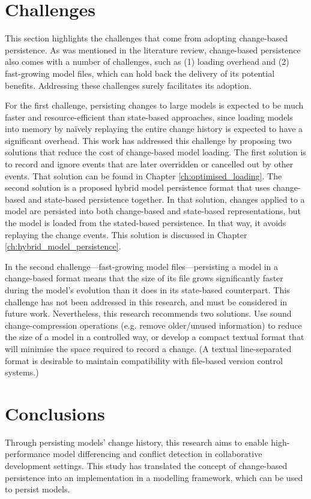 \section{Challenges}
\label{sec:challenges}
This section highlights the challenges that come from adopting change-based persistence. As was mentioned in the literature review, change-based persistence also comes with a number of challenges, such as (1) loading overhead and (2) fast-growing model files, which can hold back the delivery of its potential benefits. Addressing these challenges surely facilitates its adoption.

For the first challenge, persisting changes to large models is expected to be much faster and resource-efficient than state-based approaches, since loading models into memory by naïvely replaying the entire change history is expected to have a significant overhead. This work has addressed this challenge by proposing two solutions that reduce the cost of change-based model loading. The first solution is to record and ignore events that are later overridden or cancelled out by other events. That solution can be found in Chapter \ref{ch:optimised_loading}. The second solution is a proposed hybrid model persistence format that uses change-based and state-based persistence together. In that solution, changes applied to a model are persisted into both change-based and state-based representations, but the model is loaded from the stated-based persistence. In that way, it avoids replaying the change events. This solution is discussed in Chapter \ref{ch:hybrid_model_persistence}.

In the second challenge—fast-growing model files—persisting a model in a change-based format means that the size of its file grows significantly faster during the model’s evolution than it does in its state-based counterpart. This challenge has not been addressed in this research, and must be considered in future work. Nevertheless, this research recommends two solutions. Use sound change-compression operations (e.g. remove older/unused information) to reduce the size of a model in a controlled way, or develop  a compact textual format that will minimise the space required to record a change. (A textual line-separated format is desirable to maintain compatibility with file-based version control systems.)

\section{Conclusions}
\label{sec:conclusions_3}
Through persisting models’ change history, this research aims to enable high-performance model differencing and conflict detection in collaborative development settings. This study has translated the concept of change-based persistence into an implementation in a modelling framework, which can be used to persist models.

